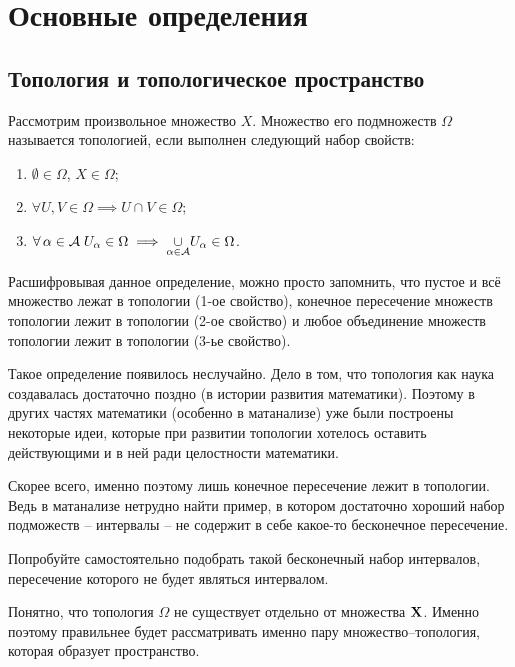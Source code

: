 \section{Основные определения}
\subsection{Топология и топологическое пространство}
\begin{Def}[Топология]
    Рассмотрим произвольное множество $X$. Множество его подмножеств $\Omega$ называется топологией, если выполнен следующий набор свойств:
    \begin{enumerate}
        \item $\emptyset \in \Omega$, $X \in \Omega$;
        \item $\forall U, V \in \Omega  \implies U \cap V \in \Omega$;
    \item $\forall \alpha \in \mathcal{A} \; U_\alpha \in \Omega \implies \underset{\tiny \alpha\in\mathcal{A}}{\cup}U_\alpha \in \Omega $.
    \end{enumerate}
\end{Def}

Расшифровывая данное определение, можно просто запомнить, что пустое и всё множество лежат в топологии (1-ое свойство), конечное пересечение множеств топологии лежит в топологии (2-ое свойство) и любое объединение множеств топологии лежит в топологии (3-ье свойство).
\begin{Note}
    Такое определение появилось неслучайно. Дело в том, что топология как наука создавалась достаточно поздно (в истории развития математики). Поэтому в других частях математики (особенно в матанализе) уже были построены некоторые идеи, которые при развитии топологии хотелось оставить действующими и в ней ради целостности математики.

    Скорее всего, именно поэтому лишь конечное пересечение лежит в топологии. Ведь в матанализе нетрудно найти пример, в котором достаточно хороший набор подможеств -- интервалы -- не содержит в себе какое-то бесконечное пересечение. 
\end{Note}
\begin{Task}
    Попробуйте самостоятельно подобрать такой бесконечный набор интервалов, пересечение которого не будет являться интервалом.
\end{Task}

Понятно, что топология $\Omega$ не существует отдельно от множества $\mathbf{X}$. Именно поэтому правильнее будет рассматривать именно пару множество--топология, которая образует пространство. 

